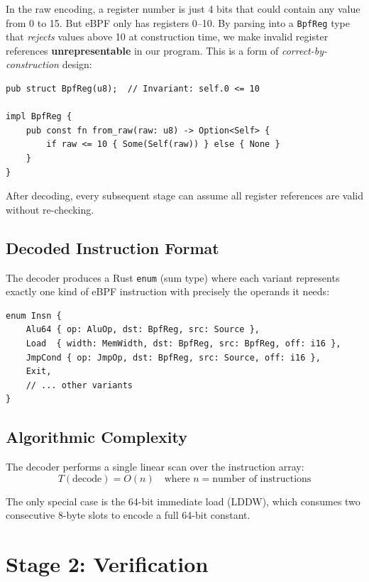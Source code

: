 \documentclass[11pt,letterpaper]{article}
\begin{document}
In the raw encoding, a register number is just 4 bits that could contain any value from 0 to 15. But eBPF only has registers 0--10. By parsing into a \texttt{BpfReg} type that \emph{rejects} values above 10 at construction time, we make invalid register references \textbf{unrepresentable} in our program. This is a form of \emph{correct-by-construction} design:

\begin{lstlisting}[style=rust]
pub struct BpfReg(u8);  // Invariant: self.0 <= 10

impl BpfReg {
    pub const fn from_raw(raw: u8) -> Option<Self> {
        if raw <= 10 { Some(Self(raw)) } else { None }
    }
}
\end{lstlisting}

After decoding, every subsequent stage can assume all register references are valid without re-checking.

\subsection{Decoded Instruction Format}

The decoder produces a Rust \texttt{enum} (sum type) where each variant represents exactly one kind of eBPF instruction with precisely the operands it needs:

\begin{lstlisting}[style=rust]
enum Insn {
    Alu64 { op: AluOp, dst: BpfReg, src: Source },
    Load  { width: MemWidth, dst: BpfReg, src: BpfReg, off: i16 },
    JmpCond { op: JmpOp, dst: BpfReg, src: Source, off: i16 },
    Exit,
    // ... other variants
}
\end{lstlisting}

\subsection{Algorithmic Complexity}

The decoder performs a single linear scan over the instruction array:
\[
T(\text{decode}) = O(n) \quad \text{where } n = \text{number of instructions}
\]

The only special case is the 64-bit immediate load (LDDW), which consumes two consecutive 8-byte slots to encode a full 64-bit constant.

\section{Stage 2: Verification}
\label{sec:verifier}
\end{document}
